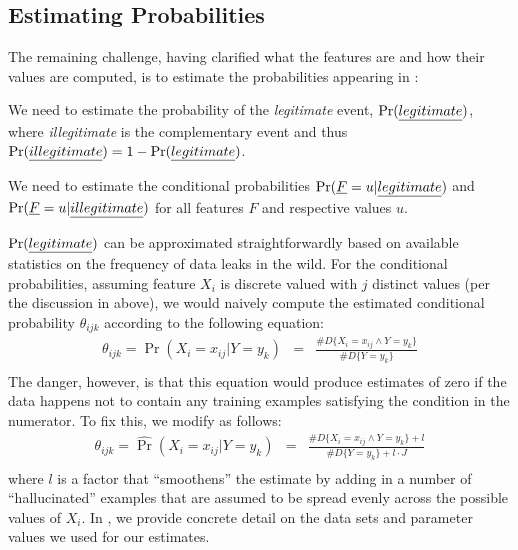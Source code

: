 \subsection{Estimating Probabilities}\label{Se:estprob}

The remaining challenge, having clarified what the features are and how their values are computed, is to estimate the probabilities appearing in :
\begin{compactitem}
	\item We need to estimate the probability of the \emph{legitimate} event, $\Pr(\emph{legitimate})$, where \emph{illegitimate} is the complementary event and thus
	$\Pr(\emph{illegitimate}) = 1 - \Pr(\emph{legitimate})$.
	\item We need to estimate the conditional probabilities $\Pr(\emph{F} = u | \emph{legitimate})$ and $\Pr(\emph{F} = u | \emph{illegitimate})$ for all features $F$
	and respective values $u$.
\end{compactitem}

$\Pr(\emph{legitimate})$ can be approximated straightforwardly based on available statistics on the frequency of data leaks in the wild. For the conditional probabilities, assuming feature $X_i$ is discrete valued with $j$ distinct values (per the discussion in  above), we would naively compute the
estimated conditional probability $\theta_{ijk}$ according to the following equation:
\begin{equation}\label{Eq:naiveEstimate}
	\begin{array}{lcr}
		\theta_{ijk} = \widehat{\Pr}(X_i = x_{ij} | Y=y_k) & = & \frac{\# D \{ X_i = x_{ij} \wedge Y = y_k \}}{\# D \{ Y = y_k \}} \\
	\end{array}
\end{equation}
The danger, however, is that this equation would produce estimates of zero if the data happens not to contain any training examples satisfying the condition in the numerator. To fix this, we modify  as follows:
\begin{equation}\label{Eq:smoothEstimate}
	\begin{array}{lcr}
		\theta_{ijk} = \widehat{\Pr}(X_i = x_{ij} | Y=y_k) & = & \frac{\# D \{ X_i = x_{ij} \wedge Y = y_k \} + l}{\# D \{ Y = y_k \} + l \cdot J} \\
	\end{array}
\end{equation}
where $l$ is a factor that ``smoothens'' the estimate by adding in a number of ``hallucinated'' examples that are assumed to be spread evenly across the possible values of $X_i$. In , we provide concrete detail on the data sets and parameter values we used for our estimates.


